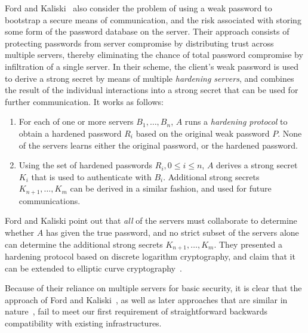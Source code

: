Ford and Kaliski~\cite{ford00} also consider the problem of using a
weak password to bootstrap a secure means of communication, and the
risk associated with storing some form of the password database on the
server. Their approach consists of protecting passwords from server
compromise by distributing trust across multiple servers, thereby
eliminating the chance of total password compromise by infiltration of
a single server. In their scheme, the client's weak password is used
to derive a strong secret by means of multiple \emph{hardening
servers}, and combines the result of the individual interactions into
a strong secret that can be used for further communication. It works
as follows:
\begin{enumerate}
\item For each of one or more servers $B_1, \ldots, B_n$, $A$ runs a
  \emph{hardening protocol} to obtain a hardened password $R_i$ based
  on the original weak password $P$. None of the servers learns either
  the original password, or the hardened password.
\item Using the set of hardened passwords $R_i, 0 \le i \le n$, $A$
  derives a strong secret $K_i$ that is used to authenticate with
  $B_i$. Additional strong secrets $K_{n+1}, \ldots, K_m$ can be
  derived in a similar fashion, and used for future communications.
\end{enumerate}
Ford and Kaliski point out that \emph{all} of the servers must
collaborate to determine whether $A$ has given the true password, and
no strict subset of the servers alone can determine the additional
strong secrets $K_{n+1}, \ldots, K_m$. They presented a hardening
protocol based on discrete logarithm cryptography, and claim that it
can be extended to elliptic curve cryptography~\cite{ford00}.

Because of their reliance on multiple servers for basic security, it
is clear that the approach of Ford and Kaliski~\cite{ford00}, as well
as later approaches that are similar in
nature~\cite{brainard03,mackenzie02}, fail to meet our first
requirement of straightforward backwards compatibility with existing
infrastructures.
